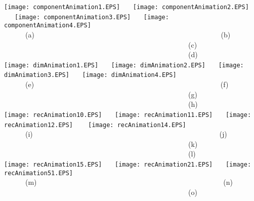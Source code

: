 \documentclass{vgtc}                          %
\begin{document}
\begin{figure*}[htb]
\texttt{[image: componentAnimation1.EPS]} \ \ \
\texttt{[image: componentAnimation2.EPS]} \ \ \
\texttt{[image: componentAnimation3.EPS]} \ \ \
\texttt{[image: componentAnimation4.EPS]}\\ 
 \ \ \ \ \ \ (a) \ \ \ \ \ \ \ \ \ \ \ \ \ \ \ \ \ \ \ \ \ \ \ \ \ \ \ \ \ \ \ \ \ \ \ \ \ \ \ \  \ \ \ \ \ \ \ \ \ \ \ \ (b) \ \ \ \ \ \ \ \ \ \ \ \ \ \ \ \ \ \ \ \ \ \ \ \ \ \ \ \ \ \ \ \ \ \ \ \ \ \ \ \  \ \ \ \ \ \ \ \ \ \ \ \ (c) \ \ \ \ \ \ \ \ \ \ \ \ \ \ \ \ \ \ \ \ \ \ \ \ \ \ \ \ \ \ \ \ \ \ \ \ \ \ \ \  \ \ \ \ \ \ \ \ \ \ \ \ (d) \\ 
\texttt{[image: dimAnimation1.EPS]} \ \ \
\texttt{[image: dimAnimation2.EPS]} \ \ \
\texttt{[image: dimAnimation3.EPS]} \ \ \
\texttt{[image: dimAnimation4.EPS]}\\
  \ \ \ \ \ \ (e) \ \ \ \ \ \ \ \ \ \ \ \ \ \ \ \ \ \ \ \ \ \ \ \ \ \ \ \ \ \ \ \ \ \ \ \ \ \ \ \  \ \ \ \ \ \ \ \ \ \ \ \ (f) \ \ \ \ \ \ \ \ \ \ \ \ \ \ \ \ \ \ \ \ \ \ \ \ \ \ \ \ \ \ \ \ \ \ \ \ \ \ \ \  \ \ \ \ \ \ \ \ \ \ \ \ (g) \ \ \ \ \ \ \ \ \ \ \ \ \ \ \ \ \ \ \ \ \ \ \ \ \ \ \ \ \ \ \ \ \ \ \ \ \ \ \ \  \ \ \ \ \ \ \ \ \ \ \ \ (h) \\ 
\texttt{[image: recAnimation10.EPS]} \ \ \
\texttt{[image: recAnimation11.EPS]} \ \ \
\texttt{[image: recAnimation12.EPS]} \ \ \
\texttt{[image: recAnimation14.EPS]}\\
 \ \ \ \ \ \ (i)  \ \ \ \ \ \ \ \ \ \ \ \ \ \ \ \ \ \ \ \ \ \ \ \ \ \ \ \ \ \ \ \ \ \ \ \ \ \ \ \  \ \ \ \ \ \ \ \ \ \ \ \ (j) \ \ \ \ \ \ \ \ \ \ \ \ \ \ \ \ \ \ \ \ \ \ \ \ \ \ \ \ \ \ \ \ \ \ \ \ \ \ \ \  \ \ \ \ \ \ \ \ \ \ \ \ (k) \ \ \ \ \ \ \ \ \ \ \ \ \ \ \ \ \ \ \ \ \ \ \ \ \ \ \ \ \ \ \ \ \ \ \ \ \ \ \ \  \ \ \ \ \ \ \ \ \ \ \ \ (l) \\ 
\texttt{[image: recAnimation15.EPS]} \ \ \
\texttt{[image: recAnimation21.EPS]} \ \ \
\texttt{[image: recAnimation51.EPS]}\\
  \ \ \ \ \ \ (m) \ \ \ \ \ \ \ \ \ \ \ \ \ \ \ \ \ \ \ \ \ \ \ \ \ \ \ \ \ \ \ \ \ \ \ \ \ \ \ \  \ \ \ \ \ \ \ \ \ \ \ \ (n) \ \ \ \ \ \ \ \ \ \ \ \ \ \ \ \ \ \ \ \ \ \ \ \ \ \ \ \ \ \ \ \ \ \ \ \ \ \ \ \  \ \ \ \ \ \ \ \ \ \ \ \ (o)\\ 

\end{figure*}
\end{document}
